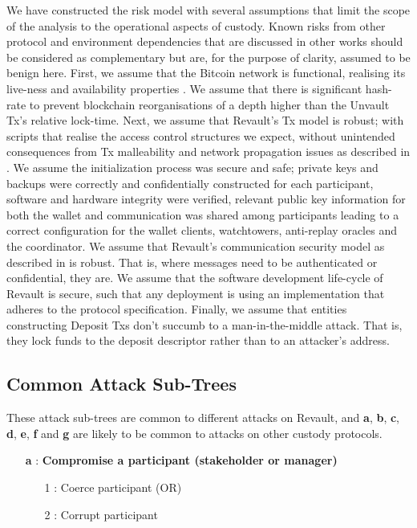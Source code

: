 \documentclass[runningheads]{llncs}
\begin{document}
We have constructed the risk model with several assumptions that limit the scope of the analysis to the operational aspects of custody. Known risks from other protocol and environment dependencies that are discussed in other works should be considered as complementary but are, for the purpose of clarity, assumed to be benign here. First, we assume that the Bitcoin network is functional, realising its live-ness and availability properties \cite{Garay2015,Garay2017,Pass2017,Badertscher2017,Badertscher2018}. We assume that there is significant hash-rate to prevent blockchain reorganisations of a depth higher than the Unvault Tx's relative lock-time. Next, we assume that Revault's Tx model is robust; with scripts that realise the access control structures we expect, without unintended consequences from Tx malleability and network propagation issues as described in \cite{revault-pdf}. We assume the initialization process was secure and safe; private keys and  backups were correctly and confidentially constructed for each participant, software and hardware integrity were verified, relevant public key information for both the wallet and communication was shared among participants leading to a correct configuration for the wallet clients, watchtowers, anti-replay oracles and the coordinator. We assume that Revault's communication security model as described in \cite{practical-revault} is robust. That is, where messages need to be authenticated or confidential, they are. We assume that the software development life-cycle of Revault is secure, such that any deployment is using an implementation that adheres to the protocol specification. Finally, we assume that entities constructing Deposit Txs don't succumb to a man-in-the-middle attack. That is, they lock funds to the deposit descriptor rather than to an attacker's address.

\subsection{Common Attack Sub-Trees}

These attack sub-trees are common to different attacks on Revault, and \textbf{a}, \textbf{b}, \textbf{c}, \textbf{d}, \textbf{e}, \textbf{f} and \textbf{g} are likely to be common to attacks on other custody protocols. 

{\footnotesize
\begin{itemize}[noitemsep,parsep=0pt,partopsep=0pt, leftmargin=0.7cm]
\item[\textbf{a} :] \textbf{Compromise a participant (stakeholder or manager)}
\begin{itemize}[noitemsep,topsep=0pt,parsep=0pt,partopsep=0pt, leftmargin=0.8cm]
\item[1 :] Coerce participant (OR)
\item[2 :] Corrupt participant
\end{itemize}
\end{itemize}
}
\end{document}
